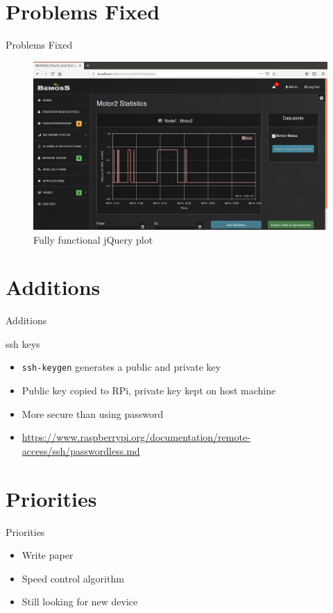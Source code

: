 \documentclass{beamer}
\begin{document}
\section{Problems Fixed}
\begin{frame}{Problems Fixed}{}
\begin{figure}
\includegraphics[scale=0.25]{figs/motorchart.png}
\caption{Fully functional jQuery plot}
\end{figure}
\end{frame}

\section{Additions}
\begin{frame}{Additions}{}
\begin{block}{ssh keys}
\begin{itemize}
\item \texttt{ssh-keygen} generates a public and private key
\item Public key copied to RPi, private key kept on host machine
\item More secure than using password
\item \url{https://www.raspberrypi.org/documentation/remote-access/ssh/passwordless.md}
\end{itemize}
\end{block}
\end{frame}

\section{Priorities}
\begin{frame}{Priorities}{}
\begin{itemize}
\item Write paper
\item Speed control algorithm
\item Still looking for new device
\end{itemize}
\end{frame}
\end{document}
